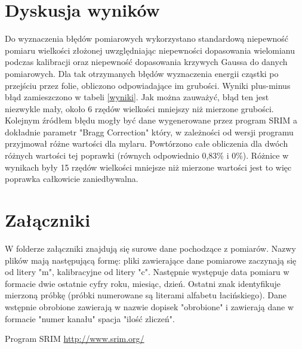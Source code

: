 \documentclass[12pt,a4paper]{article}
\begin{document}
\section{Dyskusja wyników}
Do wyznaczenia błędów pomiarowych wykorzystano standardową niepewność pomiaru wielkości złożonej uwzględniając niepewności dopasowania wielomianu podczas kalibracji oraz niepewność dopasowania krzywych Gaussa do danych pomiarowych. Dla tak otrzymanych błędów wyznaczenia energii cząstki po przejściu przez folie, obliczono odpowiadające im grubości. Wyniki plus-minus błąd zamieszczono w tabeli \ref{wyniki}. Jak można zauważyć, błąd ten jest niezwykle mały, około 6 rzędów wielkości mniejszy niż mierzone grubości.
Kolejnym źródłem błędu mogły być dane wygenerowane przez program SRIM a dokładnie parametr "Bragg Correction" który, w zależności od wersji programu przyjmował różne wartości dla mylaru. Powtórzono całe obliczenia dla dwóch różnych wartości tej poprawki (równych odpowiednio 0,83\% i 0\%). Różnice w wynikach były 15 rzędów wielkości mniejsze niż mierzone wartości jest to więc poprawka całkowicie zaniedbywalna. 

\section{Załączniki}
W folderze załączniki znajdują się surowe dane pochodzące z pomiarów. Nazwy plików mają następującą formę: pliki zawierające dane pomiarowe zaczynają się od litery "m", kalibracyjne od litery "c". Następnie występuje data pomiaru w formacie dwie ostatnie cyfry roku, miesiąc, dzień. Ostatni znak identyfikuje mierzoną próbkę (próbki numerowane są literami alfabetu łacińskiego). Dane wstępnie obrobione zawierają w nazwie dopisek "\textunderscore obrobione" i zawierają dane w formacie "numer kanału" spacja "ilość zliczeń".

\begin{thebibliography}{9}
Program SRIM
\url{http://www.srim.org/}
\end{thebibliography}
\end{document}
